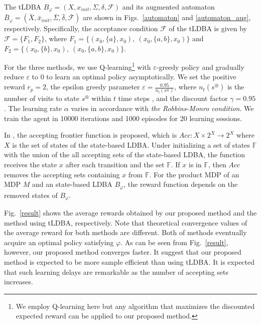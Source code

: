 \documentclass[letterpaper, 10 pt, conference]{ieeeconf}  %
\begin{document}
The tLDBA $B_{\varphi} = (X, x_{init},\Sigma,\delta,\mathcal{F})$ and its augmented automaton $\bar{B}_{\varphi} = (\bar{X},\bar{x}_{init},\bar{\Sigma},\bar{\delta},\bar{\mathcal{F}})$ are shown in Figs.\ \ref{automaton} and \ref{automaton_aug}, respectively. Specifically, the acceptance condition ${\mathcal F}$ of the tLDBA is given by ${\mathcal F} = \{ F_1,F_2 \}$, where $F_1=\{ (x_0, \{ a \}, x_0),\ (x_0, \{ a,b \}, x_0) \}$ and $F_2 = \{ (x_0, \{ b \}, x_0),\ (x_0, \{ a,b \}, x_0) \}$.

For the three methods, we use Q-learning\footnote{We employ Q-learning here but any algorithm that maximizes the discounted expected reward can be applied to our proposed method.} with $\varepsilon$-greedy policy and gradually reduce $\varepsilon$ to 0 to learn an optimal policy asymptotically.
We set the positive reward $r_p = 2$, the epsilon greedy parameter $ \varepsilon = \frac{0.95}{n_t(s^{\otimes})}$, where $n_t(s^{\otimes})$ is the number of visits to state $s^{\otimes}$ within $t$ time steps \cite{Singh1998}, and the discount factor $\gamma = 0.95$. The learning rate $\alpha$ varies in accordance with {\it the Robbins-Monro condition}. We train the agent in 10000 iterations and 1000 episodes for 20 learning sessions.

 In \cite{HAK2019,HKAKPL2019}, the accepting frontier function is proposed, which is $Acc : X \times 2^X \rightarrow 2^X $ where $X$ is the set of states of the state-based LDBA. Under initializing a set of states $ \mathbb{F} $ with the union of the all accepting sets of the state-based LDBA, the function receives the state $x$ after each transition and the set $\mathbb{F}$. If $x$ is in $\mathbb{F}$, then $Acc$ removes the accepting sets containing $x$ from $\mathbb{F}$. For the product MDP of an MDP $M$ and an state-based LDBA $B_{\varphi}$, the reward function depends on the removed states of $B_{\varphi}$.

Fig.\ \ref{result} shows the average rewards obtained by our proposed method and the method using tLDBA, respectively. Note that theoretical convergence values of the average reward for both methods are different. Both of methods eventually acquire an optimal policy satisfying $\varphi$. As can be seen from Fig.\ \ref{result}, however, our proposed method converges faster. It suggest that our proposed method is expected to be more sample efficient than using tLDBA. It is expected that such learning delays are remarkable as the number of accepting sets increases.
\end{document}

